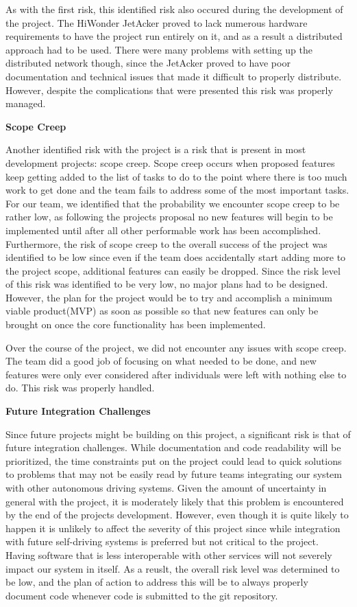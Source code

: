\documentclass[titlepage,draft]{article}
\begin{document}
As with the first risk, this identified risk also occured during the development of the project. The HiWonder JetAcker proved to lack numerous hardware requirements to have the project run entirely on it, and as a result a distributed approach had to be used. There were many problems with setting up the distributed network though, since the JetAcker proved to have poor documentation and technical issues that made it difficult to properly distribute. However, despite the complications that were presented this risk was properly managed.

\textbf{Scope Creep}

Another identified risk with the project is a risk that is present in most development projects: scope creep. Scope creep occurs when proposed features keep getting added to the list of tasks to do to the point where there is too much work to get done and the team fails to address some of the most important tasks. For our team, we identified that the probability we encounter scope creep to be rather low, as following the projects proposal no new features will begin to be implemented until after all other performable work has been accomplished. Furthermore, the risk of scope creep to the overall success of the project was identified to be low since even if the team does accidentally start adding more to the project scope, additional features can easily be dropped. Since the risk level of this risk was identified to be very low, no major plans had to be designed. However, the plan for the project would be to try and accomplish a minimum viable product(MVP) as soon as possible so that new features can only be brought on once the core functionality has been implemented.

Over the course of the project, we did not encounter any issues with scope creep. The team did a good job of focusing on what needed to be done, and new features were only ever considered after individuals were left with nothing else to do. This risk was properly handled.

\textbf{Future Integration Challenges}

Since future projects might be building on this project, a significant risk is that of future integration challenges. While documentation and code readability will be prioritized, the time constraints put on the project could lead to quick solutions to problems that may not be easily read by future teams integrating our system with other autonomous driving systems. Given the amount of uncertainty in general with the project, it is moderately likely that this problem is encountered by the end of the projects development. However, even though it is quite likely to happen it is unlikely to affect the severity of this project since while integration with future self-driving systems is preferred but not critical to the project. Having software that is less interoperable with other services will not severely impact our system in itself. As a reuslt, the overall risk level was determined to be low, and the plan of action to address this will be to always properly document code whenever code is submitted to the git repository.
\end{document}
